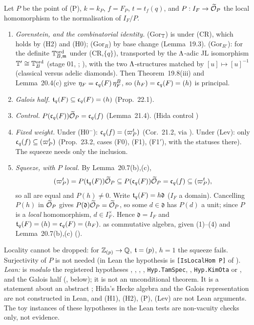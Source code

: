 \begin{outline}
Let $P$ be the point of (P), $k=k_P$, $f=F_P$, $t=t_f(q)$, and $P:I_F\to\widetilde{\mathcal{O}}_P$ the local homomorphism to the normalisation of
$I_F/P$.
\begin{enumerate}[label=(\arabic*)]
\item \emph{Gorenstein, and the combinatorial identity.} (Gor$_{\mathbb{T}}$) is \cite[\S3.3, p.~17--18]{Hs} \stcited{} under (CR), which holds by (H2)
  and (H0); (Gor$_R$) by base change (Lemma~19.3). (Gor$_{R'}$): \cite[Thm~4.5 and proof, p.~34]{Hs} \stcited{} for the definite
  $\mathbb{T}^{\mathrm{ord}}_{B,\mathfrak{m}}$ under (CR,$\{q\}$), transported by the $\Lambda$-adic JL isomorphism $\mathbb{T}'\cong\mathbb{T}^{\mathrm{ord}}_B$ (stage 01, ;
  \cite[Rem.~7.8]{Hs}), with the two $\Lambda$-structures matched by $[u]\mapsto[u]^{-1}$ (classical versus adelic diamonds). Then
  Theorem~19.8(iii) and Lemma~20.4(c) give $\eta_F=\mathfrak{c}_q(F)\,\eta^B_F$, so $(h_F)=\mathfrak{c}_q(F)=(h)$ is principal. \stpmc
\item \emph{Galois half.} $\mathfrak{t}_q(F)\subseteq\mathfrak{c}_q(F)=(h)$ (Prop.~22.1). \stpmc
\item \emph{Control.} $P(\mathfrak{c}_q(F))\widetilde{\mathcal{O}}_P=\mathfrak{c}_q(f)$ (Lemma~21.4). \stpmc{} (Hida control \stcited)
\item \emph{Fixed weight.} Under (H0$^-$): $\mathfrak{c}_q(f)=(\varpi_P^t)$ (Cor.~21.2, \stpmc{} via \cite[Thm~1.1]{KO}). Under (Lev): only
  $\mathfrak{c}_q(f)\subseteq(\varpi_P^t)$ (Prop.~23.2, cases (F0), (F1), (F1$'$), with the statuses there). The squeeze needs only the inclusion.
\item \emph{Squeeze, with $P$ local.} By Lemma~20.7(b),(c),
  \[(\varpi_P^t)=P(\mathfrak{t}_q(F))\widetilde{\mathcal{O}}_P\subseteq P(\mathfrak{c}_q(F))\widetilde{\mathcal{O}}_P=\mathfrak{c}_q(f)\subseteq(\varpi_P^t),\]
  so all are equal and $P(h)\ne0$. Write $\mathfrak{t}_q(F)=h\mathfrak d$ ($I_F$ a domain). Cancelling $P(h)$ in $\widetilde{\mathcal{O}}_P$ gives
  $P(\mathfrak d)\widetilde{\mathcal{O}}_P=\widetilde{\mathcal{O}}_P$, so some $d\in\mathfrak d$ has $P(d)$ a unit; since $P$ is a \emph{local} homomorphism, $d\in I_F^\times$.
  Hence $\mathfrak d=I_F$ and $\mathfrak{t}_q(F)=(h)=\mathfrak{c}_q(F)=(h_F)$. \stproved{} as commutative algebra, given (1)--(4) and Lemma~20.7(b),(c) (\stpmc).
\end{enumerate}
Locality cannot be dropped: for $\mathbb{Z}_{(p)}\to\mathbb{Q}$, $\mathfrak{t}=(p)$, $h=1$ the squeeze fails. Surjectivity of $P$ is not needed (in Lean the
hypothesis is \texttt{[IsLocalHom P]} of ). \emph{Lean:}  is \stformal{} \emph{modulo}
the registered hypotheses , , , ,
\texttt{Hyp.TamSpec}, , \texttt{Hyp.KimOta} or , and the Galois half
(, below); it is not an unconditional theorem. It is a statement about an abstract ;
Hida's Hecke algebra and the Galois representation are not constructed in Lean, and (H1), (H2), (P), (Lev) are not Lean arguments.
The toy instances of these hypotheses in the Lean tests are non-vacuity checks only, not evidence.
\end{outline}

